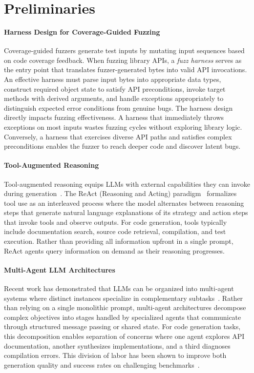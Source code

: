 
\section{Preliminaries}

\paragraph{Harness Design for Coverage-Guided Fuzzing}
Coverage-guided fuzzers generate test inputs by mutating input sequences based on code coverage feedback. When fuzzing library APIs, a \emph{fuzz harness} serves as the entry point that translates fuzzer-generated bytes into valid API invocations. An effective harness must parse input bytes into appropriate data types, construct required object state to satisfy API preconditions, invoke target methods with derived arguments, and handle exceptions appropriately to distinguish expected error conditions from genuine bugs. The harness design directly impacts fuzzing effectiveness. A harness that immediately throws exceptions on most inputs wastes fuzzing cycles without exploring library logic. Conversely, a harness that exercises diverse API paths and satisfies complex preconditions enables the fuzzer to reach deeper code and discover latent bugs.

\paragraph{Tool-Augmented Reasoning}
Tool-augmented reasoning equips LLMs with external capabilities they can invoke during generation~\cite{DBLP:conf/nips/SchickDSHWSCSW23:Toolformer,CITE:ToolLLM}. The ReAct (Reasoning and Acting) paradigm~\cite{DBLP:conf/iclr:YaoZYDN023:ReAct} formalizes tool use as an interleaved process where the model alternates between reasoning steps that generate natural language explanations of its strategy and action steps that invoke tools and observe outputs. For code generation, tools typically include documentation search, source code retrieval, compilation, and test execution. Rather than providing all information upfront in a single prompt, ReAct agents query information on demand as their reasoning progresses.

\paragraph{Multi-Agent LLM Architectures}
Recent work has demonstrated that LLMs can be organized into multi-agent systems where distinct instances specialize in complementary subtasks~\cite{CITE:MultiAgentCode}. Rather than relying on a single monolithic prompt, multi-agent architectures decompose complex objectives into stages handled by specialized agents that communicate through structured message passing or shared state. For code generation tasks, this decomposition enables separation of concerns where one agent explores API documentation, another synthesizes implementations, and a third diagnoses compilation errors. This division of labor has been shown to improve both generation quality and success rates on challenging benchmarks~\cite{CITE:AgentBench}.

